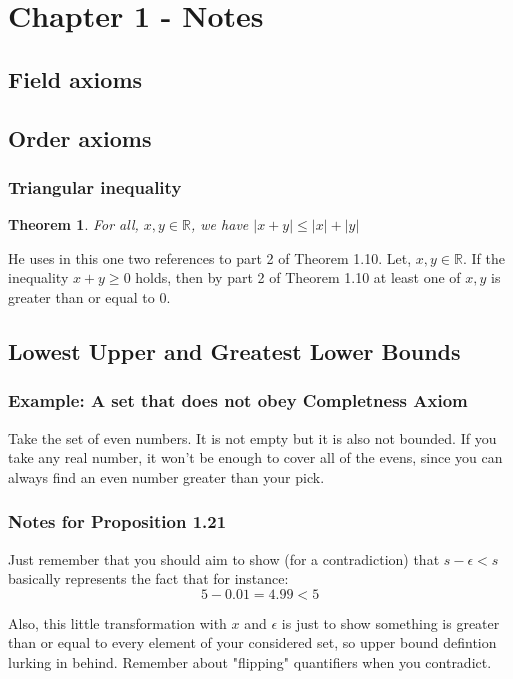 \documentclass{article}
\newtheorem*{theorem}{Theorem}
\begin{document}
\section{Chapter 1 - Notes}
\subsection{Field axioms}
\subsection{Order axioms}
\subsubsection{Triangular inequality}
\begin{theorem}
    For all, \(x, y \in \mathbb{R}\), we have \(|x + y| \leq |x| + |y|\)
\end{theorem}

He uses in this one two references to part 2 of Theorem 1.10. Let, \(x, y \in \mathbb{R}\). If the
inequality \(x + y \geq 0\) holds, then by part 2 of Theorem 1.10 at least one of \(x, y\) is greater than or equal to \(0\).

\subsection{Lowest Upper and Greatest Lower Bounds}
\subsubsection*{Example: A set that does not obey Completness Axiom}
Take the set of even numbers. It is not empty but it is also not bounded. If you take any real number, it won't be enough
to cover all of the evens, since you can always find an even number greater than your pick.
\subsubsection*{Notes for Proposition 1.21}
Just remember that you should aim to show (for a contradiction) that \(s - \epsilon < s\) basically represents the fact that for instance:
\begin{equation*}
    5 - 0.01 = 4.99 < 5 
\end{equation*}

Also, this little transformation with \(x\) and \(\epsilon\) is just to show something is greater than or equal to every element 
of your considered set, so upper bound defintion lurking in behind. Remember about "flipping" quantifiers when you contradict.
\end{document}
